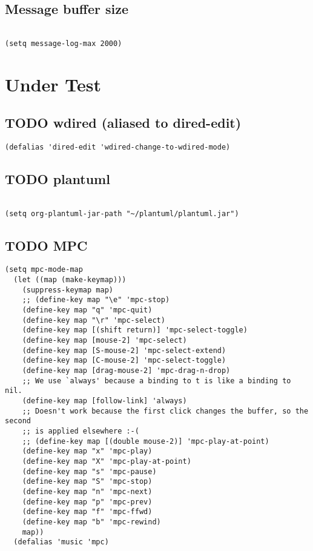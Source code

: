 \documentclass[colorlinks=true,urlcolor=blue,listings-sv]{article}
\begin{document}
\subsection{\textbf{Message} buffer size}
\label{sec-1-57}



\lstset{language=Lisp}
\begin{lstlisting}

(setq message-log-max 2000)
\end{lstlisting}
\section{Under Test}
\label{sec-2}
\subsection{\textbf{TODO} wdired (aliased to dired-edit)}
\label{sec-2-1}



\lstset{language=Lisp}
\begin{lstlisting}
(defalias 'dired-edit 'wdired-change-to-wdired-mode)
\end{lstlisting}
\subsection{\textbf{TODO} plantuml}
\label{sec-2-2}



\lstset{language=Lisp}
\begin{lstlisting}

(setq org-plantuml-jar-path "~/plantuml/plantuml.jar")
\end{lstlisting}
\subsection{\textbf{TODO} MPC}
\label{sec-2-3}


\lstset{language=Lisp}
\begin{lstlisting}
(setq mpc-mode-map
  (let ((map (make-keymap)))
    (suppress-keymap map)
    ;; (define-key map "\e" 'mpc-stop)
    (define-key map "q" 'mpc-quit)
    (define-key map "\r" 'mpc-select)
    (define-key map [(shift return)] 'mpc-select-toggle)
    (define-key map [mouse-2] 'mpc-select)
    (define-key map [S-mouse-2] 'mpc-select-extend)
    (define-key map [C-mouse-2] 'mpc-select-toggle)
    (define-key map [drag-mouse-2] 'mpc-drag-n-drop)
    ;; We use `always' because a binding to t is like a binding to nil.
    (define-key map [follow-link] 'always)
    ;; Doesn't work because the first click changes the buffer, so the second
    ;; is applied elsewhere :-(
    ;; (define-key map [(double mouse-2)] 'mpc-play-at-point)
    (define-key map "x" 'mpc-play)
    (define-key map "X" 'mpc-play-at-point)
    (define-key map "s" 'mpc-pause)
    (define-key map "S" 'mpc-stop)
    (define-key map "n" 'mpc-next)
    (define-key map "p" 'mpc-prev)
    (define-key map "f" 'mpc-ffwd)
    (define-key map "b" 'mpc-rewind)
    map))
  (defalias 'music 'mpc)
\end{lstlisting}
\end{document}
